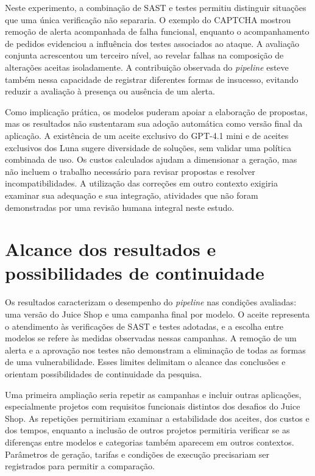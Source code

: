 Neste experimento, a combinação de SAST e testes permitiu distinguir situações que uma única verificação não separaria. O exemplo do CAPTCHA mostrou remoção de alerta acompanhada de falha funcional, enquanto o acompanhamento de pedidos evidenciou a influência dos testes associados ao ataque. A avaliação conjunta acrescentou um terceiro nível, ao revelar falhas na composição de alterações aceitas isoladamente. A contribuição observada do \textit{pipeline} esteve também nessa capacidade de registrar diferentes formas de insucesso, evitando reduzir a avaliação à presença ou ausência de um alerta.

Como implicação prática, os modelos puderam apoiar a elaboração de propostas, mas os resultados não sustentaram sua adoção automática como versão final da aplicação. A existência de um aceite exclusivo do GPT-4.1 mini e de aceites exclusivos dos Luna sugere diversidade de soluções, sem validar uma política combinada de uso. Os custos calculados ajudam a dimensionar a geração, mas não incluem o trabalho necessário para revisar propostas e resolver incompatibilidades. A utilização das correções em outro contexto exigiria examinar sua adequação e sua integração, atividades que não foram demonstradas por uma revisão humana integral neste estudo.

\section{Alcance dos resultados e possibilidades de continuidade}

\label{sec:res-continuidade}

Os resultados caracterizam o desempenho do \textit{pipeline} nas condições avaliadas: uma versão do Juice Shop e uma campanha final por modelo. O aceite representa o atendimento às verificações de SAST e testes adotadas, e a escolha entre modelos se refere às medidas observadas nessas campanhas. A remoção de um alerta e a aprovação nos testes não demonstram a eliminação de todas as formas de uma vulnerabilidade. Esses limites delimitam o alcance das conclusões e orientam possibilidades de continuidade da pesquisa.

Uma primeira ampliação seria repetir as campanhas e incluir outras aplicações, especialmente projetos com requisitos funcionais distintos dos desafios do Juice Shop. As repetições permitiriam examinar a estabilidade dos aceites, dos custos e dos tempos, enquanto a inclusão de outros projetos permitiria verificar se as diferenças entre modelos e categorias também aparecem em outros contextos. Parâmetros de geração, tarifas e condições de execução precisariam ser registrados para permitir a comparação.

